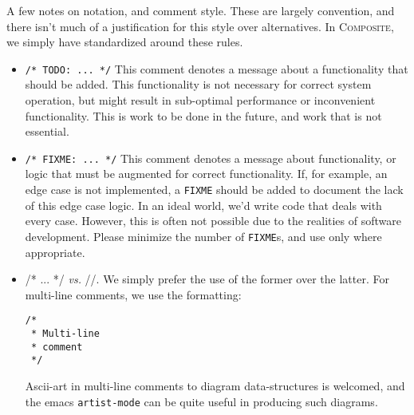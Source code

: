 \documentclass[11pt,onecolumn]{article}
\def\composite{\textsc{Composite}}
\begin{document}
A few notes on notation, and comment style.  These are largely
convention, and there isn't much of a justification for this style
over alternatives.  In \composite , we simply have standardized around
these rules.
\begin{itemize}[itemsep=0pt,topsep=1pt,parsep=1pt,leftmargin=2.5em]
\item {\tt /* TODO: ... */} This comment denotes a message about a
  functionality that should be added.  This functionality is not
  necessary for correct system operation, but might result in
  sub-optimal performance or inconvenient functionality.  This is work
  to be done in the future, and work that is not essential.
\item {\tt /* FIXME: ... */} This comment denotes a message about
  functionality, or logic that must be augmented for correct
  functionality.  If, for example, an edge case is not implemented, a
  {\tt FIXME} should be added to document the lack of this edge case
  logic.  In an ideal world, we'd write code that deals with every
  case.  However, this is often not possible due to the realities of
  software development.  Please minimize the number of {\tt FIXME}s,
  and use only where appropriate.
\item {/* ... */} {\em vs.} {//}.  We simply prefer the use of the
  former over the latter.  For multi-line comments, we use the
  formatting:
    \begin{minipage}{3in}
      \footnotesize
      \lstset{language=C}
      \begin{lstlisting}
/*
 * Multi-line
 * comment
 */
      \end{lstlisting}
    \end{minipage}

  Ascii-art in multi-line comments to diagram data-structures is
  welcomed, and the emacs {\tt artist-mode} can be quite useful in
  producing such diagrams.


\end{itemize}
\end{document}
